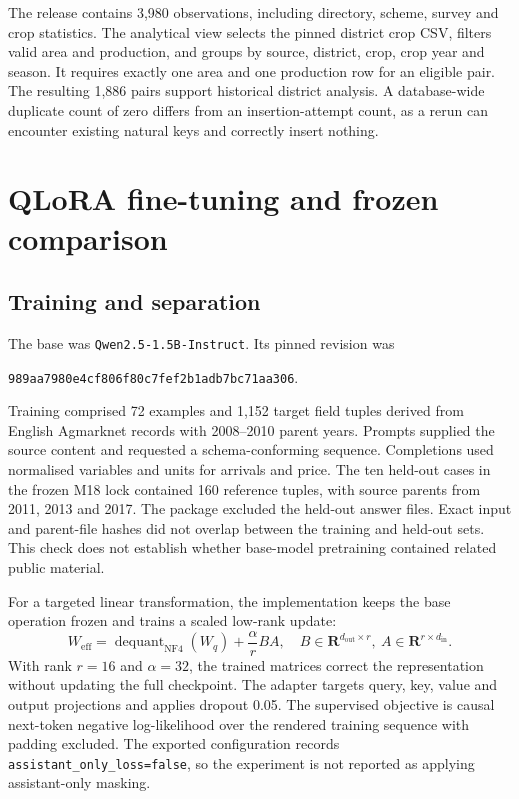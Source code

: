 \documentclass[11pt,a4paper]{article}
\newcommand{\code}[1]{\texttt{#1}}
\begin{document}
The release contains 3,980 observations, including directory, scheme, survey and crop statistics. The analytical view selects the pinned district crop CSV, filters valid area and production, and groups by source, district, crop, crop year and season. It requires exactly one area and one production row for an eligible pair. The resulting 1,886 pairs support historical district analysis. A database-wide duplicate count of zero differs from an insertion-attempt count, as a rerun can encounter existing natural keys and correctly insert nothing.


\clearpage
\section{QLoRA fine-tuning and frozen comparison}
\subsection{Training and separation}
The base was \code{Qwen2.5-1.5B-Instruct}. Its pinned revision was
\begin{center}
\small\texttt{989aa7980e4cf806f80c7fef2b1adb7bc71aa306}.
\end{center}
Training comprised 72 examples and 1,152 target field tuples derived from English Agmarknet records with 2008--2010 parent years. Prompts supplied the source content and requested a schema-conforming sequence. Completions used normalised variables and units for arrivals and price. The ten held-out cases in the frozen M18 lock contained 160 reference tuples, with source parents from 2011, 2013 and 2017. The package excluded the held-out answer files. Exact input and parent-file hashes did not overlap between the training and held-out sets. This check does not establish whether base-model pretraining contained related public material.

For a targeted linear transformation, the implementation keeps the base operation frozen and trains a scaled low-rank update:
\begin{equation}
W_{\mathrm{eff}}=\operatorname{dequant}_{\mathrm{NF4}}(W_q)+\frac{\alpha}{r}BA,
\quad
B\in\mathbf{R}^{d_\mathrm{out}\times r},\
A\in\mathbf{R}^{r\times d_\mathrm{in}}.
\end{equation}
With rank \(r=16\) and \(\alpha=32\), the trained matrices correct the representation without updating the full checkpoint. The adapter targets query, key, value and output projections and applies dropout 0.05. The supervised objective is causal next-token negative log-likelihood over the rendered training sequence with padding excluded. The exported configuration records \code{assistant\_only\_loss=false}, so the experiment is not reported as applying assistant-only masking.
\end{document}
